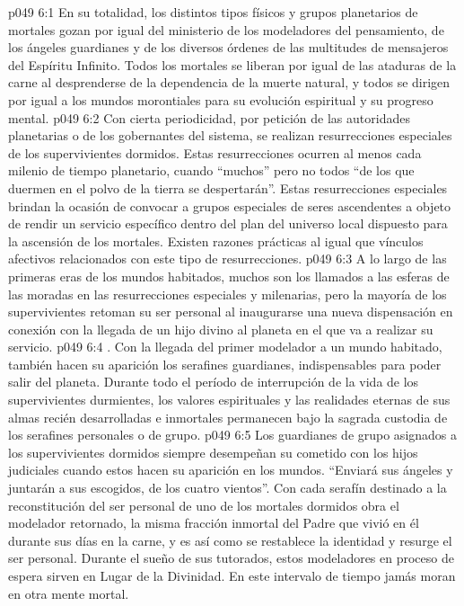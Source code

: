 \vs p049 6:1 En su totalidad, los distintos tipos físicos y grupos planetarios de mortales gozan por igual del ministerio de los modeladores del pensamiento, de los ángeles guardianes y de los diversos órdenes de las multitudes de mensajeros del Espíritu Infinito. Todos los mortales se liberan por igual de las ataduras de la carne al desprenderse de la dependencia de la muerte natural, y todos se dirigen por igual a los mundos morontiales para su evolución espiritual y su progreso mental.
\vs p049 6:2 Con cierta periodicidad, por petición de las autoridades planetarias o de los gobernantes del sistema, se realizan resurrecciones especiales de los supervivientes dormidos. Estas resurrecciones ocurren al menos cada milenio de tiempo planetario, cuando “muchos” pero no todos “de los que duermen en el polvo de la tierra se despertarán”. Estas resurrecciones especiales brindan la ocasión de convocar a grupos especiales de seres ascendentes a objeto de rendir un servicio específico dentro del plan del universo local dispuesto para la ascensión de los mortales. Existen razones prácticas al igual que vínculos afectivos relacionados con este tipo de resurrecciones.
\vs p049 6:3 A lo largo de las primeras eras de los mundos habitados, muchos son los llamados a las esferas de las moradas en las resurrecciones especiales y milenarias, pero la mayoría de los supervivientes retoman su ser personal al inaugurarse una nueva dispensación en conexión con la llegada de un hijo divino al planeta en el que va a realizar su servicio.
\vs p049 6:4 \pc {}. Con la llegada del primer modelador a un mundo habitado, también hacen su aparición los serafines guardianes, indispensables para poder salir del planeta. Durante todo el período de interrupción de la vida de los supervivientes durmientes, los valores espirituales y las realidades eternas de sus almas recién desarrolladas e inmortales permanecen bajo la sagrada custodia de los serafines personales o de grupo.
\vs p049 6:5 Los guardianes de grupo asignados a los supervivientes dormidos siempre desempeñan su cometido con los hijos judiciales cuando estos hacen su aparición en los mundos. “Enviará sus ángeles y juntarán a sus escogidos, de los cuatro vientos”. Con cada serafín destinado a la reconstitución del ser personal de uno de los mortales dormidos obra el modelador retornado, la misma fracción inmortal del Padre que vivió en él durante sus días en la carne, y es así como se restablece la identidad y resurge el ser personal. Durante el sueño de sus tutorados, estos modeladores en proceso de espera sirven en Lugar de la Divinidad. En este intervalo de tiempo jamás moran en otra mente mortal.
